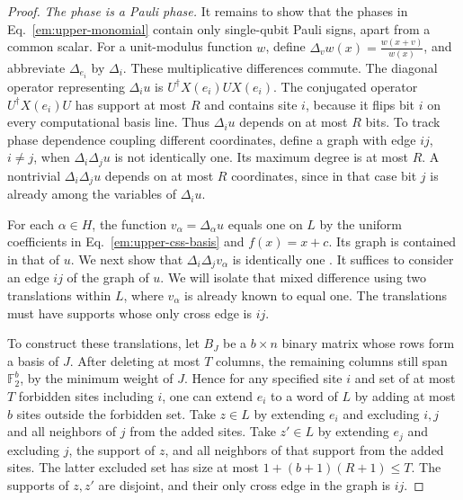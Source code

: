\documentclass[aps,prl,reprint,longbibliography,nofootinbib,nobibnotes]{revtex4-2}
\newif\ifshowchanges
\DeclareRobustCommand{\rev}[1]{\leavevmode{\ifshowchanges\color{RevisionPurple}%
  \hypersetup{allcolors=RevisionPurple}\fi #1%
  \ifhmode\xdef\revspacefactor{\the\spacefactor}%
    \aftergroup\revrestorespacefactor\fi}}
\newcommand{\revrestorespacefactor}{\ifhmode\spacefactor\revspacefactor\relax\fi}
\begin{document}
\begin{proof}
\emph{The phase is a Pauli phase.}
It remains to show that the phases in Eq.~\eqref{em:upper-monomial} contain only single-qubit Pauli
signs, apart from a common scalar. For a unit-modulus function $w$, define $\Delta_v
w(x)=\frac{w(x+v)}{w(x)}$, and abbreviate $\Delta_{e_i}$ by $\Delta_i$. These multiplicative
differences commute. The diagonal operator representing $\Delta_i u$ is $U^\dagger X(e_i)U X(e_i)$.
The conjugated operator $U^\dagger X(e_i)U$ has support at most $R$ and contains site $i$, because
it flips bit $i$ on every computational basis line. Thus $\Delta_i u$ depends on at most $R$ bits.
To track phase dependence coupling different coordinates, define a graph with edge $ij$, $i\ne j$,
when $\Delta_i\Delta_j u$ is not identically one. Its maximum degree is at most $R$. A nontrivial
$\Delta_i\Delta_j u$ depends on at most $R$ coordinates, since in that case bit $j$ is already
among the variables of $\Delta_i u$.

For each $\alpha\in H$, the function $v_\alpha=\Delta_\alpha u$ equals one on $L$ by the uniform
coefficients in Eq.~\eqref{em:upper-css-basis} and $f(x)=x+c$. Its graph is contained in that of
$u$. We next show that $\Delta_i\Delta_j v_\alpha$ is identically one \rev{for every $i\ne j$}. It suffices to consider
an edge $ij$ of the graph of $u$. We will isolate that mixed difference using two translations
within $L$, where $v_\alpha$ is already known to equal one. The translations must have supports
whose only cross edge is $ij$.

To construct these translations, let $B_J$ be a $b\times n$ binary matrix whose rows form a basis
of $J$. After deleting at most $T$ columns, the remaining columns still span $\mathbb F_2^b$, by
the minimum weight of $J$. Hence for any specified site $i$ and set of at most $T$ forbidden sites
including $i$, one can extend $e_i$ to a word of $L$ by adding at most $b$ sites outside the
forbidden set. Take $z\in L$ by extending $e_i$ and excluding $i,j$ and all neighbors of $j$ from
the added sites. Take $z'\in L$ by extending $e_j$ and excluding $j$, the support of $z$, and all
neighbors of that support from the added sites. The latter excluded set has size at most
$1+(b+1)(R+1)\le T$. The supports of $z,z'$ are disjoint, and their only cross edge in the graph is
$ij$.


\end{proof}
\end{document}
